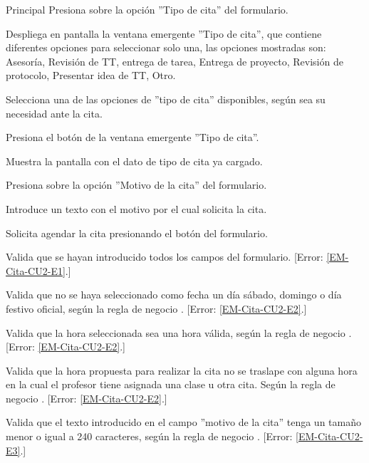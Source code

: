 \begin{UCtrayectoria}{Principal}
	\UCpaso [\UCactor] Presiona sobre la opción ''Tipo de cita'' del formulario. \label{l_EM_Citas_CU2_tipoCita} 

	\UCpaso Despliega en pantalla la ventana emergente ''Tipo de cita'', que contiene diferentes opciones para seleccionar solo una, las opciones mostradas son: Asesoría, Revisión de TT, entrega de tarea, Entrega de proyecto, Revisión de protocolo, Presentar idea de TT, Otro.

	\UCpaso [\UCactor] Selecciona una de las opciones de ''tipo de cita'' disponibles, según sea su necesidad ante la cita.

	\UCpaso [\UCactor] Presiona el botón  de la ventana emergente ''Tipo de cita''. 

	\UCpaso Muestra la pantalla  con el dato de tipo de cita ya cargado.

	\UCpaso [\UCactor] Presiona sobre la opción ''Motivo de la cita'' del formulario.

	\UCpaso [\UCactor] Introduce un texto con el motivo por el cual solicita la cita.

	\UCpaso [\UCactor] Solicita agendar la cita presionando el botón  del formulario.

	\UCpaso Valida que se hayan introducido todos los campos del formulario. [Error: \ref{EM-Cita-CU2-E1}.]

	\UCpaso Valida que no se haya seleccionado como fecha un día sábado, domingo o día festivo oficial, según la regla de negocio . [Error: \ref{EM-Cita-CU2-E2}.]

	\UCpaso Valida que la hora seleccionada sea una hora válida, según la regla de negocio . [Error: \ref{EM-Cita-CU2-E2}.]

	\UCpaso Valida que la hora propuesta para realizar la cita no se traslape con alguna hora en la cual el profesor tiene asignada una clase u otra cita. Según la regla de negocio . [Error: \ref{EM-Cita-CU2-E2}.]

	\UCpaso Valida que el texto introducido en el campo ''motivo de la cita'' tenga un tamaño menor o igual a 240 caracteres, según la regla de negocio . [Error: \ref{EM-Cita-CU2-E3}.]


\end{UCtrayectoria}
